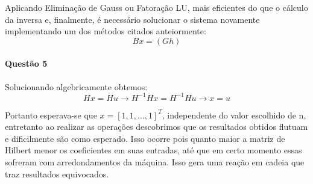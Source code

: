 \documentclass{article}
\begin{document}
            Aplicando Eliminação de Gauss ou Fatoração LU, mais eficientes do que o cálculo da inversa e, finalmente, é necessário solucionar o sistema novamente implementando um dos métodos citados anteiormente:
                \[Bx = (Gh)\]
            
            \paragraph{Questão 5}Solucionando algebricamente obtemos:
                \[Hx = Hu \rightarrow H^{-1}Hx = H^{-1}Hu \rightarrow x = u\]
            
            Portanto esperava-se que $x = [1, 1, ..., 1]^T$, independente do valor escolhido de n, entretanto ao realizar as operações descobrimos que os resultados obtidos flutuam e dificilmente são como esperado. Isso ocorre pois quanto maior a matriz de Hilbert menor os coeficientes em suas entradas, até que em certo momento essas sofreram com arredondamentos da máquina. Isso gera uma reação em cadeia que traz resultados equivocados.
\end{document}
